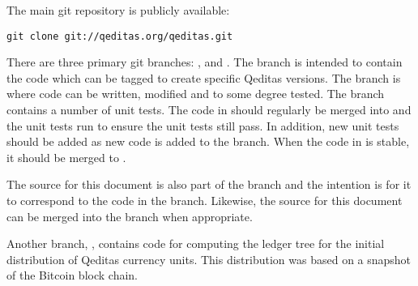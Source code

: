 The main git repository is publicly available:
\begin{verbatim}
git clone git://qeditas.org/qeditas.git
\end{verbatim}

There are three primary git branches: \master, {\dev} and \testing.
The {\master} branch is intended to contain the code which can be tagged to create
specific Qeditas versions.
The {\dev} branch is where code can be written, modified and to some degree tested.
The {\testing} branch contains a number of unit tests.
The code in {\dev} should regularly be merged into {\testing} and
the unit tests run to ensure the unit tests still pass.
In addition, new unit tests should be added as new code is added to the {\dev} branch.
When the code in {\dev} is stable, it should be merged to \master.

The source for this document is also part of the {\dev} branch and
the intention is for it to correspond to the code in the {\dev} branch.
Likewise, the source for this document can be merged into the {\master} branch
when appropriate.

Another branch, \initdistr, contains code for computing the ledger tree for
the initial distribution of Qeditas currency units. This distribution
was based on a snapshot of the Bitcoin block chain.

